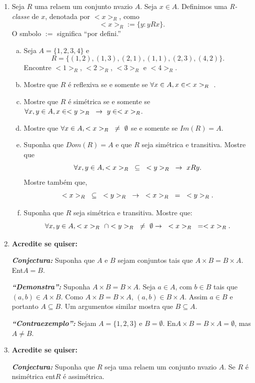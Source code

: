 \begin{enumerate}[{\bf 1.}]
\item Seja $R$ uma rela\cao em um conjunto n\ao vazio $A$. Seja $x\in A$. Definimos uma {\it R-classe} de $x$, denotada por $<x>_R$, como
\[
<x>_R:=\{y:yRx\}.
\]
O s\ih mbolo $:=$ significa ``por defini\caoi.''
\begin{enumerate}[a)]
\item Seja $A=\{1,2,3,4\}$ e
\[
R=\{(1,2), (1,3), (2,1), (1,1), (2,3), (4,2)\}.
\] 
Encontre $<1>_R$, $<2>_R$, $<3>_R$ e $<4>_R$. 
\item Mostre que $R$ \'e reflexiva se e somente se $\forall x\in A, x\in <x>_R\textrm{ }$.
\item Mostre que $R$ \'e sim\'etrica se e somente se $\forall x,y\in A, x\in <y>_R\textrm{ }\to\textrm{ } y\in <x>_R$.
\item Mostre que $\forall x\in A, <x>_R\textrm{ }\neq\textrm{ }\emptyset$ se e somente se $Im(R)=A$.
\item Suponha que $Dom(R)=A$ e que $R$ seja sim\'etrica e transitiva. Mostre que
\[
\forall x,y\in A, <x>_R\textrm{ }\subseteq\textrm{ }<y>_R\textrm{ }\to\textrm{ } xRy.
\]
Mostre tamb\'em que,
\[
<x>_R\textrm{ }\subseteq\textrm{ }<y>_R\textrm{ }\to\textrm{ } <x>_R\textrm{ }=\textrm{ }<y>_R.
\]
\item Suponha que $R$ seja sim\'etrica e transitiva. Mostre que:
\[
\forall x,y\in A, <x>_R\textrm{ }\cap <y>_R\textrm{ }\neq\textrm{ }\emptyset\to\textrm{ } <x>_R\textrm{ }=<x>_R.
\]
\end{enumerate}

\item {\bf Acredite se quiser:}  

\noindent \textit{\textbf{Conjectura:}} Suponha que $A$ e $B$ sejam conjuntos tais que $A\times B=B\times A$. Ent\ao $A=B$.

\noindent \textit{\textbf{``Demonstra\caoi'':}} Suponha $A\times B=B\times A$. Seja $a\in A$, com $b\in B$ tais que $(a,b)\in A\times B$. Como $A\times B=B\times A$, $(a,b)\in B\times A$. Assim $a\in B$ e portanto $A\subseteq B$. Um argumentos similar mostra que $B\subseteq A$.

\noindent \textit{\textbf{``Contraexemplo'':}} Sejam $A=\{1,2,3\}$ e $B=\emptyset$. En\tao $A\times B=B\times A=\emptyset$, mas $A\neq B$. 

\item {\bf Acredite se quiser:}  

\noindent \textit{\textbf{Conjectura:}} Suponha que $R$ seja uma rela\cao em um conjunto n\ao vazio $A$. Se $R$ \'e n\ao sim\'etrica ent\ao $R$ \'e assim\'etrica. 


\end{enumerate}
